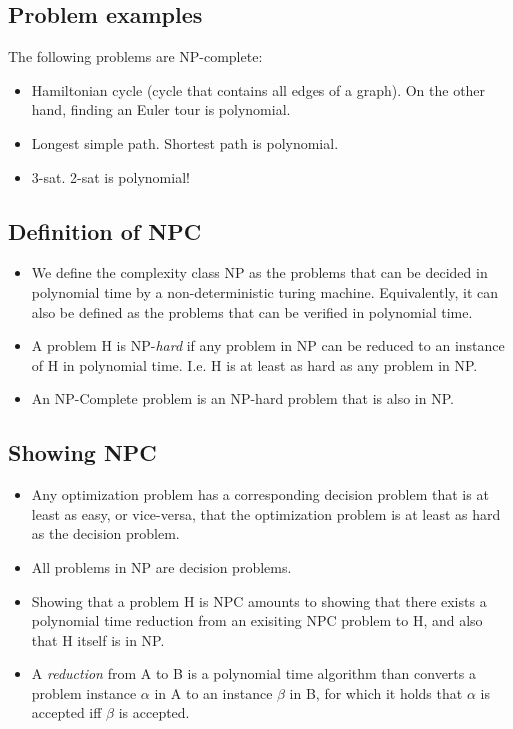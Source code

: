 \subsection{Problem examples}
The following problems are NP-complete:
\begin{itemize}
\item Hamiltonian cycle (cycle that contains all edges of a graph). On
  the other hand, finding an Euler tour is polynomial.
\item Longest simple path. Shortest path is polynomial.
\item 3-sat. 2-sat is polynomial!
\end{itemize}

\subsection{Definition of NPC}
\begin{itemize}
\item We define the complexity class NP as the problems that can be
  decided in polynomial time by a non-deterministic turing
  machine. Equivalently, it can also be defined as the problems that
  can be verified in polynomial time.
\item A problem H is NP-\emph{hard} if any problem in NP can be
  reduced to an instance of H in polynomial time. I.e. H is at least
  as hard as any problem in NP.
\item An NP-Complete problem is an NP-hard problem that is also in NP.
\end{itemize}

\subsection{Showing NPC}
\begin{itemize}
\item Any optimization problem has a corresponding decision problem
  that is at least as easy, or vice-versa, that the optimization
  problem is at least as hard as the decision problem.
\item All problems in NP are decision problems.
\item Showing that a problem H is NPC amounts to showing that there
  exists a polynomial time reduction from an exisiting NPC problem to
  H, and also that H itself is in NP.
\item A \emph{reduction} from A to B is a polynomial time algorithm
  than converts a problem instance $\alpha$ in A to an instance
  $\beta$ in B, for which it holds that $\alpha$ is accepted iff
  $\beta$ is accepted.
\end{itemize}

